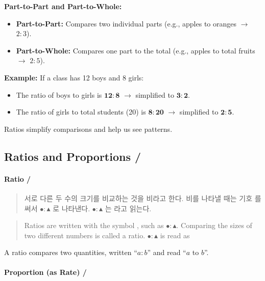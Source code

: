 \textbf{Part-to-Part and Part-to-Whole:}
\begin{itemize}
  \item \textbf{Part-to-Part:} Compares two individual parts (e.g., apples to oranges \(\rightarrow\) \(2:3\)).
  \item \textbf{Part-to-Whole:} Compares one part to the total (e.g., apples to total fruits \(\rightarrow\) \(2:5\)).
\end{itemize}

\textbf{Example:} If a class has 12 boys and 8 girls:
\begin{itemize}
  \item The ratio of boys to girls is \(\mathbf{12:8}\) \(\rightarrow\) simplified to \(\mathbf{3:2}\).
  \item The ratio of girls to total students (20) is \(\mathbf{8:20}\) \(\rightarrow\) simplified to \(\mathbf{2:5}\).
\end{itemize}

Ratios simplify comparisons and help us see patterns.





\subsection*{Ratios and Proportions / }

\paragraph{Ratio / }
\begin{quote}
서로 다른 두 수의 크기를 비교하는 것을 비라고 한다. 비를 나타낼 때는 기호 \inlinequote{:}를 써서 $\bullet : \blacktriangle$ 로 나타낸다. 
$\bullet : \blacktriangle$ 는  라고 읽는다.
\end{quote}
\begin{quote}
Ratios are written with the symbol \inlinequote{:}, such as $\bullet : \blacktriangle$. Comparing 
the sizes of two different numbers is called a ratio. $\bullet : \blacktriangle$ is 
read as 
\end{quote}


A ratio compares two quantities, written “$a:b$” and read “$a$ to $b$”.

\paragraph{Proportion (as Rate) / }

